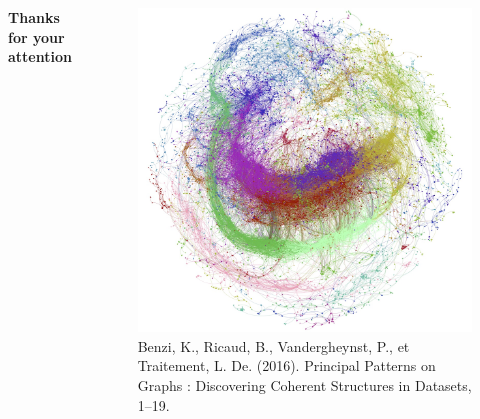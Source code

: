 \documentclass{beamer}
\begin{document}
\begin{frame}

\begin{columns}
	\begin{column}{0.47\textwidth}
	\centering
		\textbf{Thanks for your attention}
	\end{column}
	\begin{column}{0.5\textwidth}
		\begin{figure}
		\centering
			\includegraphics[width=1\linewidth]{fig7}
		\caption{\tiny Benzi, K., Ricaud, B., Vandergheynst, P., et Traitement, L. De. (2016). Principal Patterns on Graphs : Discovering Coherent Structures in Datasets, 1–19.}
		\end{figure}
	\end{column}
\end{columns}

\end{frame}
\end{document}
